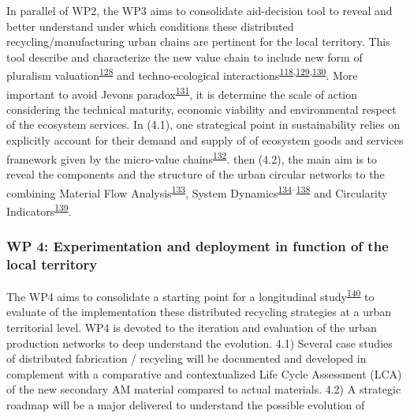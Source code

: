 \documentclass[
  12pt,
  a4paperpaper,
  onecolumn]{article}
\begin{document}
In parallel of WP2, the WP3 aims to consolidate aid-decision tool to
reveal and better understand under which conditions these distributed
recycling/manufacturing urban chains are pertinent for the local
territory. This tool describe and characterize the new value chain to
include new form of pluralism
valuation\textsuperscript{\protect\hyperlink{ref-gunton2022}{128}} and
techno-ecological
interactions\textsuperscript{\protect\hyperlink{ref-Saladini2018}{118},\protect\hyperlink{ref-Liu2020c}{129},\protect\hyperlink{ref-Liu2019g}{130}}.
More important to avoid Jevons
paradox\textsuperscript{\protect\hyperlink{ref-giampietro2018}{131}}, it
is determine the scale of action considering the technical maturity,
economic viability and environmental respect of the ecosystem services.
In (4.1), one strategical point in sustainability relies on explicitly
account for their demand and supply of of ecosystem goods and services
framework given by the micro-value
chains\textsuperscript{\protect\hyperlink{ref-Diwekar2021}{132}}. then
(4.2), the main aim is to reveal the components and the structure of the
urban circular networks to the combining Material Flow
Analysis\textsuperscript{\protect\hyperlink{ref-saidani2021}{133}},
System
Dynamics\textsuperscript{\protect\hyperlink{ref-kuo2021}{134}--\protect\hyperlink{ref-perez-perez2021}{138}}
and Circularity
Indicators\textsuperscript{\protect\hyperlink{ref-saidani2019}{139}}.

\hypertarget{wp-4-experimentation-and-deployment-in-function-of-the-local-territory}{%
\subsubsection{WP 4: Experimentation and deployment in function of the
local
territory}\label{wp-4-experimentation-and-deployment-in-function-of-the-local-territory}}

The WP4 aims to consolidate a starting point for a longitudinal
study\textsuperscript{\protect\hyperlink{ref-langley2013}{140}} to
evaluate of the implementation these distributed recycling strategies at
a urban territorial level. WP4 is devoted to the iteration and
evaluation of the urban production networks to deep understand the
evolution. 4.1) Several case studies of distributed fabrication /
recycling will be documented and developed in complement with a
comparative and contextualized Life Cycle Assessment (LCA) of the new
secondary AM material compared to actual materials. 4.2) A strategic
roadmap will be a major delivered to understand the possible evolution
of
\end{document}
